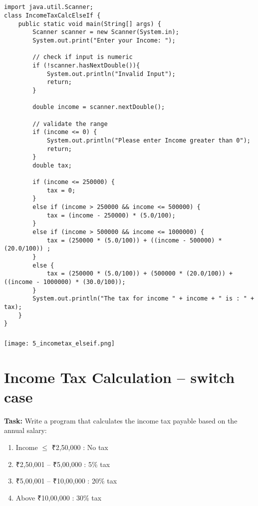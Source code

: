 \documentclass[12pt,a4paper]{article}
\begin{document}
\subsection{}
\begin{lstlisting}
import java.util.Scanner;
class IncomeTaxCalcElseIf {
    public static void main(String[] args) {
        Scanner scanner = new Scanner(System.in);
        System.out.print("Enter your Income: ");
    
        // check if input is numeric
        if (!scanner.hasNextDouble()){
            System.out.println("Invalid Input");
            return;
        }
    
        double income = scanner.nextDouble();
    
        // validate the range
        if (income <= 0) {
            System.out.println("Please enter Income greater than 0");
            return;
        }
        double tax;
    
        if (income <= 250000) {
            tax = 0;
        }
        else if (income > 250000 && income <= 500000) {
            tax = (income - 250000) * (5.0/100);
        }
        else if (income > 500000 && income <= 1000000) {
            tax = (250000 * (5.0/100)) + ((income - 500000) * (20.0/100)) ;
        }
        else {
            tax = (250000 * (5.0/100)) + (500000 * (20.0/100)) + ((income - 1000000) * (30.0/100));
        }
        System.out.println("The tax for income " + income + " is : " + tax);
    }
}
\end{lstlisting}

\subsubsection{}
\begin{center}
    \texttt{[image: 5\_incometax\_elseif.png]}
\end{center}

\section{Income Tax Calculation -- switch case }
\textbf{Task:} Write a program that calculates the income tax payable based on the annual salary:
\begin{enumerate}
    \item Income $\leq$ ₹2,50,000 : No tax
    \item ₹2,50,001 -- ₹5,00,000 : 5\% tax
    \item ₹5,00,001 -- ₹10,00,000 : 20\% tax
    \item Above ₹10,00,000 : 30\% tax
\end{enumerate}
\end{document}
